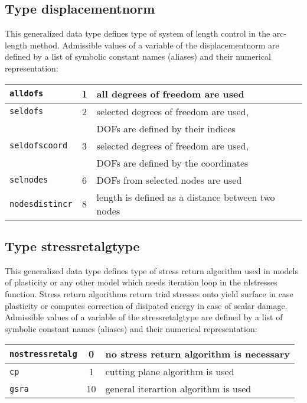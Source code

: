 \subsection{Type {\sf displacementnorm}}
\label{sectdisplacementnorm}

This generalized data type defines type of system of length control in the arc-length method.
Admissible values of a variable of the {\sf displacementnorm} are defined by a list of symbolic constant names (aliases)
and their numerical representation:

\begin{center}
\begin{tabular}{|l|c|l|}
\hline
{\tt alldofs} & 1 & all degrees of freedom are used
\\ \hline
{\tt seldofs} & 2 & selected degrees of freedom are used,
\\
 & & DOFs are defined by their indices
\\ \hline
{\tt seldofscoord} & 3 & selected degrees of freedom are used,
\\
 & & DOFs are defined by the coordinates
\\ \hline
{\tt selnodes} & 6 & DOFs from selected nodes are used
\\ \hline
{\tt nodesdistincr} & 8 & length is defined as a distance between two nodes
\\ \hline
\end{tabular}
\end{center}

\subsection{Type {\sf stressretalgtype}}
\label{sectstressretalgtype}

This generalized data type defines type of stress return algorithm used in models of plasticity or any
other model which needs iteration loop in the nlstresses function.
Stress return algorithms return trial stresses onto yield surface in case plasticity or 
computes correction of disipated energy in case of scalar damage.
Admissible values of a variable of the {\sf stressretalgtype} are defined by a list of symbolic constant names (aliases)
and their numerical representation:

\begin{center}
\begin{tabular}{|l|c|l|}
\hline
{\tt nostressretalg} & 0 & no stress return algorithm is necessary
\\ \hline
{\tt cp} & 1 & cutting plane algorithm is used \index{method!cutting plane}
\\ \hline
{\tt gsra} & 10 & general iterartion algorithm is used
\\ \hline
\end{tabular}
\end{center}

